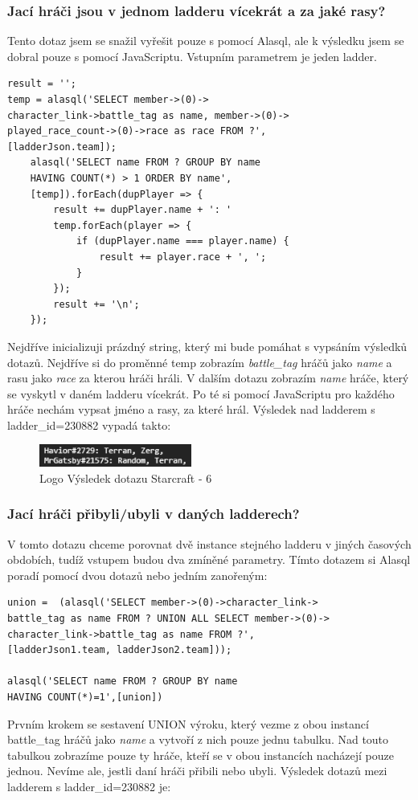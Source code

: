 \documentclass[a4, titlepage]{article}
\begin{document}
\subsubsection{Jací hráči jsou v jednom ladderu vícekrát a za jaké rasy?}
Tento dotaz jsem se snažil vyřešit pouze s pomocí Alasql, ale k výsledku jsem se dobral pouze s pomocí JavaScriptu. Vstupním parametrem je jeden ladder.
\begin{lstlisting}
result = '';
temp = alasql('SELECT member->(0)->
character_link->battle_tag as name, member->(0)->
played_race_count->(0)->race as race FROM ?', 
[ladderJson.team]);
    alasql('SELECT name FROM ? GROUP BY name 
    HAVING COUNT(*) > 1 ORDER BY name', 
    [temp]).forEach(dupPlayer => {
        result += dupPlayer.name + ': '
        temp.forEach(player => {
            if (dupPlayer.name === player.name) {
                result += player.race + ', ';
            }
        });
        result += '\n';
    });
\end{lstlisting}
Nejdříve inicializuji prázdný string, který mi bude pomáhat s vypsáním výsledků dotazů. Nejdříve si do proměnné temp zobrazím \textit{battle\_tag} hráčů jako \textit{name} a rasu jako \textit{race} za kterou hráči hráli. V dalším dotazu zobrazím \textit{name} hráče, který se vyskytl v daném ladderu vícekrát. Po té si pomocí JavaScriptu pro každého hráče nechám vypsat jméno a rasy, za které hrál. Výsledek nad ladderem s ladder\_id=230882 vypadá takto:
\begin{figure}[h]
    \centering
    \includegraphics[width=5cm]{S6}
    \caption{Logo Výsledek dotazu Starcraft - 6}
\end{figure} 

\subsubsection{Jací hráči přibyli/ubyli v daných ladderech?}
V tomto dotazu chceme porovnat dvě instance stejného ladderu v jiných časových obdobích, tudíž vstupem budou dva zmíněné parametry. Tímto dotazem si Alasql poradí pomocí dvou dotazů nebo jedním zanořeným: 
\begin{lstlisting}
union =  (alasql('SELECT member->(0)->character_link->
battle_tag as name FROM ? UNION ALL SELECT member->(0)->
character_link->battle_tag as name FROM ?', 
[ladderJson1.team, ladderJson2.team]));

alasql('SELECT name FROM ? GROUP BY name 
HAVING COUNT(*)=1',[union])
\end{lstlisting}
Prvním krokem se sestavení UNION výroku, který vezme z obou instancí battle\_tag hráčů jako \textit{name} a vytvoří z nich pouze jednu tabulku. Nad touto tabulkou zobrazíme pouze ty hráče, kteří se v obou instancích nacházejí pouze jednou. Nevíme ale, jestli daní hráči přibili nebo ubyli. Výsledek dotazů mezi ladderem s ladder\_id=230882 je:
\end{document}
